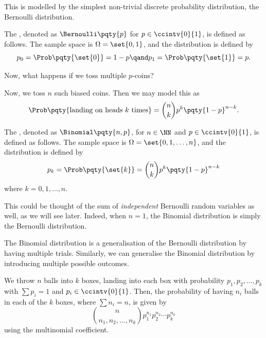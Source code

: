 This is modelled by the simplest non-trivial discrete probability distribution, the Bernoulli distribution.

\begin{definition}
    \label{def:bernoulli-distribution}%
    The , denoted as \(\Bernoulli\pqty{p}\) for \(p \in \ccintv{0}{1}\), is defined as follows. The sample space is \(\Omega = \set{0, 1}\), and the distribution is defined by
    \[
        p_0 = \Prob\pqty{\set{0}} = 1 - p \qand p_1 = \Prob\pqty{\set{1}} = p.
    \]
\end{definition}

Now, what happens if we toss multiple \(p\)-coins? 

\begin{example}
    \label{ex:tossing-multiple-biased-coins}%
    Now, we toss \(n\) such biased coins. Then we may model this as
    \[
        \Prob\pqty{\text{landing on heads }k\text{ times}} = \binom{n}{k} p^k \pqty{1 - p}^{n - k}.
    \]
\end{example}

\begin{definition}
    \label{def:binomial-distribution}%
    The , denoted as \(\Binomial\pqty{n, p}\), for \(n \in \NN\) and \(p \in \ccintv{0}{1}\), is defined as follows. The sample space is \(\Omega = \set{0, 1, \ldots, n}\), and the distribution is defined by
    \[
        p_k = \Prob\pqty{\set{k}}= \binom{n}{k} p^k \pqty{1 - p}^{n - k}
    \]
    where \(k = 0, 1, \ldots, n\).
\end{definition}

This could be thought of the sum of \emph{independent} Bernoulli random variables as well, as we will see later. Indeed, when \(n = 1\), the Binomial distribution is simply the Bernoulli distribution.

The Binomial distribution is a generalisation of the Bernoulli distribution by having multiple trials. Similarly, we can generalise the Binomial distribution by introducing multiple possible outcomes.

\begin{example}
    \label{ex:throwing-balls-into-boxes}%
    We throw \(n\) balls into \(k\) boxes, landing into each box with probability \(p_1, p_2, \ldots, p_k\) with \(\sum p_i = 1\) and \(p_i \in \ccintv{0}{1}\). Then, the probability of having \(n_i\) balls in each of the \(k\) boxes, where \(\sum n_i = n\), is given by
    \[
        \binom{n}{n_1, n_2, \ldots, n_k} p_1^{n_1} p_2^{n_2} \cdots p_k^{n_k}
    \]
    using the multinomial coefficient.
\end{example}

